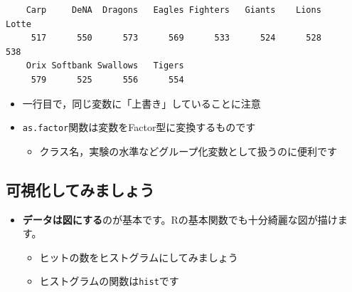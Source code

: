 \documentclass[
  a4paper,
]{ltjsbook}
\newenvironment{Shaded}{\begin{snugshade}}{\end{snugshade}}
\newcommand{\FunctionTok}[1]{\textcolor[rgb]{0.28,0.35,0.67}{#1}}
\newcommand{\NormalTok}[1]{\textcolor[rgb]{0.00,0.23,0.31}{#1}}
\newcommand{\OtherTok}[1]{\textcolor[rgb]{0.00,0.23,0.31}{#1}}
\newcommand{\SpecialCharTok}[1]{\textcolor[rgb]{0.37,0.37,0.37}{#1}}
\providecommand{\tightlist}{%
  \setlength{\itemsep}{0pt}\setlength{\parskip}{0pt}}\usepackage{longtable,booktabs,array}
\begin{document}
\begin{Shaded}
\end{Shaded}

\begin{verbatim}
    Carp     DeNA  Dragons   Eagles Fighters   Giants    Lions    Lotte 
     517      550      573      569      533      524      528      538 
    Orix Softbank Swallows   Tigers 
     579      525      556      554 
\end{verbatim}

\begin{itemize}
\tightlist
\item
  一行目で，同じ変数に「上書き」していることに注意
\item
  \texttt{as.factor}関数は変数をFactor型に変換するものです

  \begin{itemize}
  \tightlist
  \item
    クラス名，実験の水準などグループ化変数として扱うのに便利です
  \end{itemize}
\end{itemize}

\subsection{可視化してみましょう}\label{ux53efux8996ux5316ux3057ux3066ux307fux307eux3057ux3087ux3046}

\begin{itemize}
\tightlist
\item
  \textbf{データは図にする}のが基本です。Rの基本関数でも十分綺麗な図が描けます。

  \begin{itemize}
  \tightlist
  \item
    ヒットの数をヒストグラムにしてみましょう
  \item
    ヒストグラムの関数は\texttt{hist}です
  \end{itemize}
\end{itemize}

\begin{Shaded}
\end{Shaded}
\end{document}
